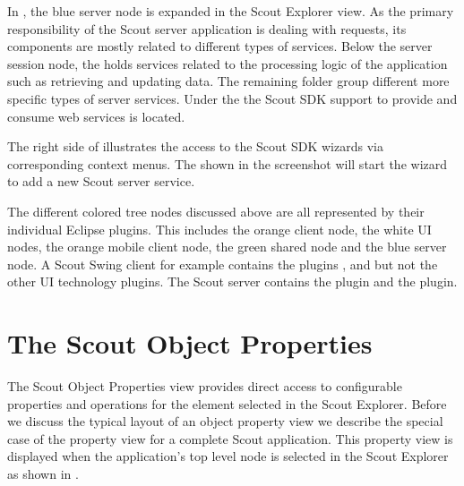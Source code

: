 \documentclass[a4paper,10pt,twoside]{book}
\begin{document}
In , the blue server node is expanded in the Scout Explorer view. 
As the primary responsibility of the Scout server application is dealing with requests, its components are mostly related to different types of services. 
Below the server session node, the  holds services related to the processing logic of the application such as retrieving and updating data. 
The remaining folder group different more specific types of server services. 
Under the  the Scout SDK support to provide and consume web services is located. 

The right side of  illustrates the access to the Scout SDK wizards via corresponding context menus. 
The  shown in the screenshot will start the wizard to add a new Scout server service. 
 
The different colored tree nodes discussed above are all represented by their individual Eclipse plugins. 
This includes the orange client node, the white UI nodes, the orange mobile client node, the green shared node and the blue server node. 
A Scout Swing client for example contains the plugins ,  and  but not the other UI technology plugins. 
The Scout server contains the  plugin and the  plugin. 

\section{The Scout Object Properties}

The Scout Object Properties view provides direct access to configurable properties and operations for the element selected in the Scout Explorer.
Before we discuss the typical layout of an object property view we describe the special case of the property view for a complete Scout application. 
This property view is displayed when the application's top level node is selected in the Scout Explorer as shown in . 
\end{document}

